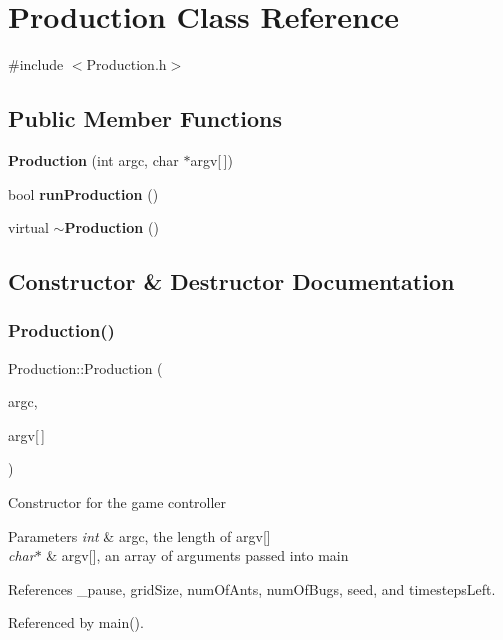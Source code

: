 \section{Production Class Reference}
\label{classProduction}


{\ttfamily \#include $<$Production.\+h$>$}

\subsection*{Public Member Functions}
\begin{DoxyCompactItemize}
\item 
\textbf{ Production} (int argc, char $\ast$argv[$\,$])
\item 
bool \textbf{ run\+Production} ()
\item 
virtual \textbf{ $\sim$\+Production} ()
\end{DoxyCompactItemize}


\subsection{Constructor \& Destructor Documentation}
\mbox{\label{classProduction_a24439558b7672feaea80dc0ab1b53ff2}} 
\subsubsection{Production()}
{\footnotesize\ttfamily Production\+::\+Production (\begin{DoxyParamCaption}\item[{int}]{argc,  }\item[{char $\ast$}]{argv[$\,$] }\end{DoxyParamCaption})}

Constructor for the game controller 
\begin{DoxyParams}{Parameters}
{\em int} & argc, the length of argv[] \\
\hline
{\em char$\ast$} & argv[], an array of arguments passed into main \\
\hline
\end{DoxyParams}


References \+\_\+pause, grid\+Size, num\+Of\+Ants, num\+Of\+Bugs, seed, and timesteps\+Left.



Referenced by main().

